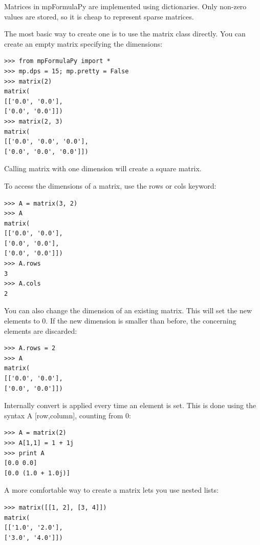 Matrices in mpFormulaPy are implemented using dictionaries. Only non-zero values are stored, so it is cheap to represent sparse matrices.

The most basic way to create one is to use the matrix class directly. You can create an empty matrix specifying the dimensions:

\begin{lstlisting}
>>> from mpFormulaPy import *
>>> mp.dps = 15; mp.pretty = False
>>> matrix(2)
matrix(
[['0.0', '0.0'],
['0.0', '0.0']])
>>> matrix(2, 3)
matrix(
[['0.0', '0.0', '0.0'],
['0.0', '0.0', '0.0']])
\end{lstlisting}


Calling matrix with one dimension will create a square matrix.

To access the dimensions of a matrix, use the rows or cols keyword:

\begin{lstlisting}
>>> A = matrix(3, 2)
>>> A
matrix(
[['0.0', '0.0'],
['0.0', '0.0'],
['0.0', '0.0']])
>>> A.rows
3
>>> A.cols
2
\end{lstlisting}

You can also change the dimension of an existing matrix. This will set the new elements to 0. If the new dimension is smaller than before, the concerning elements are discarded:

\begin{lstlisting}
>>> A.rows = 2
>>> A
matrix(
[['0.0', '0.0'],
['0.0', '0.0']])
\end{lstlisting}

Internally convert is applied every time an element is set. This is done using the syntax A [row,column], counting from 0:

\begin{lstlisting}
>>> A = matrix(2)
>>> A[1,1] = 1 + 1j
>>> print A
[0.0 0.0]
[0.0 (1.0 + 1.0j)]
\end{lstlisting}

A more comfortable way to create a matrix lets you use nested lists:

\begin{lstlisting}
>>> matrix([[1, 2], [3, 4]])
matrix(
[['1.0', '2.0'],
['3.0', '4.0']])
\end{lstlisting}


%
%

